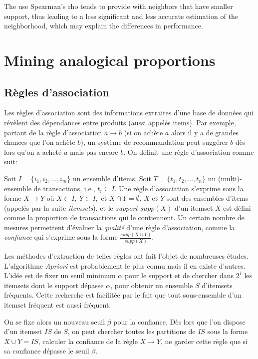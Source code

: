 The use Spearman's rho tends to provide with neighbors that have smaller
support, thus leading to a less significant and less accurate estimation of the
neighborhood, which may explain the differences in performance.

\section{Mining analogical proportions}

\subsection{Règles d'association}
Les règles d'association sont des informations extraites d'une base de
données qui révèlent des dépendances entre produits (aussi appelés
items).  Par exemple, partant
de la règle d'association $a \rightarrow b$  (si on achète $a$ alors il y a
de grandes chances que l'on achète $b$), un système de recommandation peut
suggérer $b$ dès lors qu'on a acheté $a$ mais pas encore $b$.  On définit
une règle d'association comme suit:

Soit $I= \{i_1,i_2,...,i_m \}$ un ensemble d'items. Soit $T= \{t_1, t_2,...,t_n
\}$ un (multi)-ensemble de transactions, i.e.,  $t_i \subseteq  I$. Une règle
d'association s'exprime sous la forme $X \rightarrow Y$ o\`u $X \subset I ,~ Y
\subset I, $ et $X \cap Y = \emptyset$.  $X$ et $Y$ sont des ensembles d'items
(appelés par la suite \textit{itemsets}), et le \emph{support} $supp(X)$ d'un
itemset $X$ est défini comme la proportion de
transactions qui le contiennent.  Un certain nombre de mesures permettent
d'\'evaluer la {\it qualité} d'une règle d'association, comme  la
\emph{confiance} qui s'exprime sous la forme $\frac{supp( X \cup Y)}{supp(X)}$.

Les méthodes d'extraction de telles règles ont fait l'objet de nombreuses
études. L'algorithme {\it Apriori}
\cite{AgrSriVLDB94} est probablement le plus connu mais il en existe d'autres.
L'idée   est de fixer un seuil minimum $\alpha$ pour le support et de chercher dans
$2^I$ les itemsets dont le support dépasse $\alpha$, pour obtenir un ensemble
$S$ d'itemsets fréquents. Cette recherche est facilitée par le fait que
tout sous-ensemble d'un itemset fréquent est aussi fréquent.

On se fixe alors un nouveau seuil $\beta$ pour la confiance.  Dès lors que
l'on dispose d'un itemset $IS$ de $S$, on peut chercher toutes les partitions
de $IS$ sous la forme $X \cup Y = IS$, calculer la confiance de la règle $X
\rightarrow Y$, ne garder cette règle que si sa confiance dépasse le seuil
$\beta$.

